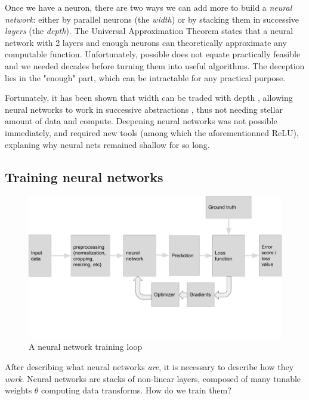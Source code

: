 Once we have a neuron, there are two ways we can add more to build a \emph{neural network}: either by parallel neurons (the \emph{width}) or by stacking them in successive \emph{layers} (the \emph{depth}). The Universal Approximation Theorem \citep{universalapprox} states that a neural network with 2 layers and enough neurons \cite{mlpbounds} can theoretically approximate any computable function. Unfortunately, possible does not equate practically feasible and we needed decades before turning them into useful algorithms. The deception lies in the "enough" part, which can be intractable for any practical purpose.

Fortunately, it has been shown that width can be traded with depth \cite{widthdepth}, allowing neural networks to work in successive abstractions \citep{deepbelief,deepviz}, thus not needing stellar amount of data and compute. Deepening neural networks was not possible immediately, and required new tools (among which the aforementionned ReLU), explaning why neural nets remained shallow for so long.

\subsection{Training neural networks}

\begin{figure}
    \centering
    \includegraphics[width=\columnwidth]{30-activity/workflow.pdf}
    \caption{A neural network training loop}
    \label{fig:trainingloop}
\end{figure}

After describing what neural networks \emph{are}, it is necessary to describe how they \emph{work}. Neural networks are stacks of non-linear layers, composed of many tunable weights $\theta$ computing data transforms. How do we train them?

